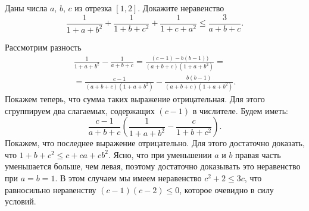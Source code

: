 Даны числа $a$, $b$, $c$ из отрезка $[1,2]$.
Докажите неравенство
\[
    \frac{1}{1 + a + b^2}
    +
    \frac{1}{1 + b + c^2}
    +
    \frac{1}{1 + c + a^2}
\leq
    \frac{3}{a + b + c}
.\]

\solution
Рассмотрим разность 
\begin{gather*}
    \frac{1}{1 + a + b^2} - \frac{1}{a + b + c}
=
    \frac{(c - 1) - b (b - 1))}{(a + b + c)(1 + a + b^2)}
=\\=
    \frac{c - 1}{(a + b + c)(1 + a + b^2)}
    -
    \frac{b (b - 1)}{(a + b + c)(1 + a + b^2)}
.\end{gather*}
Покажем теперь, что сумма таких выражение отрицательная.
Для этого сгруппируем два слагаемых, содержащих $(c - 1)$ в числителе.
Будем иметь:
\[
    \frac{c - 1}{a + b + c}
    \left(
        \frac{1}{1 + a + b^2}
        -
        \frac{c}{1 + b + c^2}
    \right)
.\]
Покажем, что последнее выражение отрицательно.
Для этого достаточно доказать, что $1 + b + c^2 \leq c + c a + c b^2$.
Ясно, что при уменьшении $a$ и $b$ правая часть уменьшается больше, чем левая,
поэтому достаточно доказывать это неравенство при $a = b = 1$.
В этом случаем мы имеем неравенство $c^2 + 2 \leq 3 c$, что равносильно
неравенству $(c - 1) (c - 2) \leq 0$, которое очевидно в силу условий.

